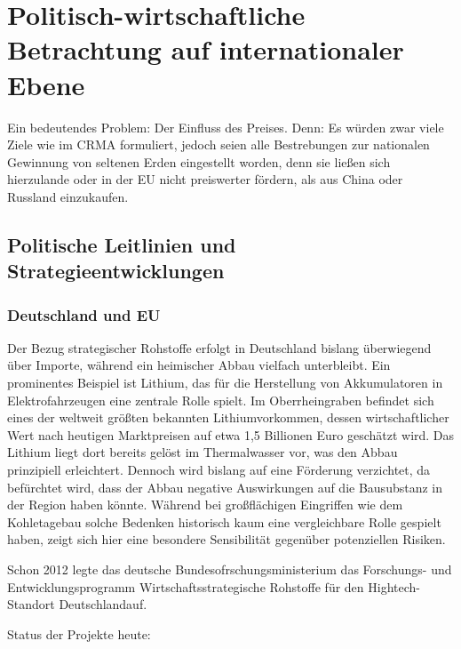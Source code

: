 \documentclass[12pt,a4paper,oneside]{book} %
\begin{document}

\chapter{Politisch-wirtschaftliche Betrachtung auf internationaler Ebene}


Ein bedeutendes Problem: Der Einfluss des Preises. Denn: Es würden zwar viele Ziele wie im CRMA formuliert, jedoch seien alle Bestrebungen zur nationalen Gewinnung von seltenen Erden eingestellt worden, denn sie ließen sich \glqq hierzulande oder in der EU nicht preiswerter fördern, als aus China oder Russland einzukaufen\grqq.\autocite{VDI Nachrichten: Seltene Erden: Deutschland importiert lieber, als selbst zu fördern}

\section{Politische Leitlinien und Strategieentwicklungen}

\subsection{Deutschland und EU}

Der Bezug strategischer Rohstoffe erfolgt in Deutschland bislang überwiegend über Importe, während ein heimischer Abbau vielfach unterbleibt. Ein prominentes Beispiel ist Lithium, das für die Herstellung von Akkumulatoren in Elektrofahrzeugen eine zentrale Rolle spielt. Im Oberrheingraben befindet sich eines der weltweit größten bekannten Lithiumvorkommen, dessen wirtschaftlicher Wert nach heutigen Marktpreisen auf etwa 1,5 Billionen Euro geschätzt wird. Das Lithium liegt dort bereits gelöst im Thermalwasser vor, was den Abbau prinzipiell erleichtert. Dennoch wird bislang auf eine Förderung verzichtet, da befürchtet wird, dass der Abbau negative Auswirkungen auf die Bausubstanz in der Region haben könnte. Während bei großflächigen Eingriffen wie dem Kohletagebau solche Bedenken historisch kaum eine vergleichbare Rolle gespielt haben, zeigt sich hier eine besondere Sensibilität gegenüber potenziellen Risiken.


Schon 2012 legte das deutsche Bundesofrschungsministerium das Forschungs- und Entwicklungsprogramm \glqq Wirtschaftsstrategische Rohstoffe für den Hightech-Standort Deutschland\grqq auf.

Status der Projekte heute:
\end{document}
